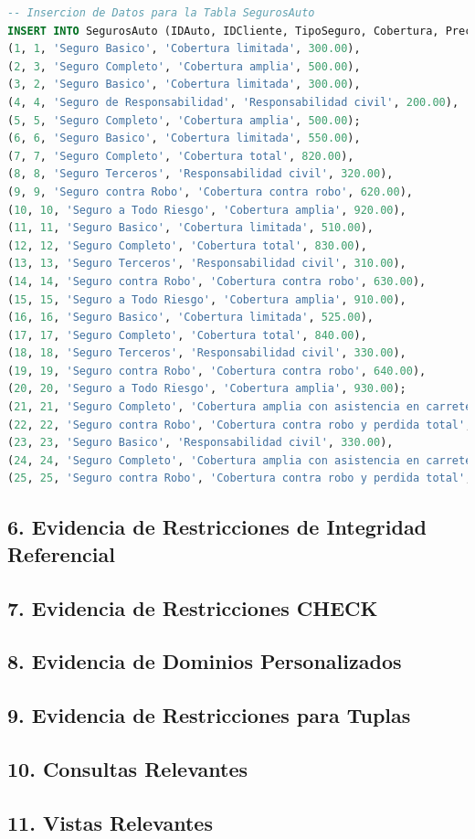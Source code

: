 \documentclass[12pt]{article}
\begin{document}
\begin{lstlisting}[language=SQL]
-- Insercion de Datos para la Tabla SegurosAuto
INSERT INTO SegurosAuto (IDAuto, IDCliente, TipoSeguro, Cobertura, Precio) VALUES
(1, 1, 'Seguro Basico', 'Cobertura limitada', 300.00),
(2, 3, 'Seguro Completo', 'Cobertura amplia', 500.00),
(3, 2, 'Seguro Basico', 'Cobertura limitada', 300.00),
(4, 4, 'Seguro de Responsabilidad', 'Responsabilidad civil', 200.00),
(5, 5, 'Seguro Completo', 'Cobertura amplia', 500.00);
(6, 6, 'Seguro Basico', 'Cobertura limitada', 550.00),
(7, 7, 'Seguro Completo', 'Cobertura total', 820.00),
(8, 8, 'Seguro Terceros', 'Responsabilidad civil', 320.00),
(9, 9, 'Seguro contra Robo', 'Cobertura contra robo', 620.00),
(10, 10, 'Seguro a Todo Riesgo', 'Cobertura amplia', 920.00),
(11, 11, 'Seguro Basico', 'Cobertura limitada', 510.00),
(12, 12, 'Seguro Completo', 'Cobertura total', 830.00),
(13, 13, 'Seguro Terceros', 'Responsabilidad civil', 310.00),
(14, 14, 'Seguro contra Robo', 'Cobertura contra robo', 630.00),
(15, 15, 'Seguro a Todo Riesgo', 'Cobertura amplia', 910.00),
(16, 16, 'Seguro Basico', 'Cobertura limitada', 525.00),
(17, 17, 'Seguro Completo', 'Cobertura total', 840.00),
(18, 18, 'Seguro Terceros', 'Responsabilidad civil', 330.00),
(19, 19, 'Seguro contra Robo', 'Cobertura contra robo', 640.00),
(20, 20, 'Seguro a Todo Riesgo', 'Cobertura amplia', 930.00);
(21, 21, 'Seguro Completo', 'Cobertura amplia con asistencia en carretera', 580.00),
(22, 22, 'Seguro contra Robo', 'Cobertura contra robo y perdida total', 460.00),
(23, 23, 'Seguro Basico', 'Responsabilidad civil', 330.00),
(24, 24, 'Seguro Completo', 'Cobertura amplia con asistencia en carretera', 600.00),
(25, 25, 'Seguro contra Robo', 'Cobertura contra robo y perdida total', 480.00);
    \end{lstlisting}    

    \subsection*{6. Evidencia de Restricciones de Integridad Referencial}

    \subsection*{7. Evidencia de Restricciones CHECK}
    
    \subsection*{8. Evidencia de Dominios Personalizados}
    
    \subsection*{9. Evidencia de Restricciones para Tuplas}
    
    \subsection*{10. Consultas Relevantes}
    
    \subsection*{11. Vistas Relevantes}
\end{document}
